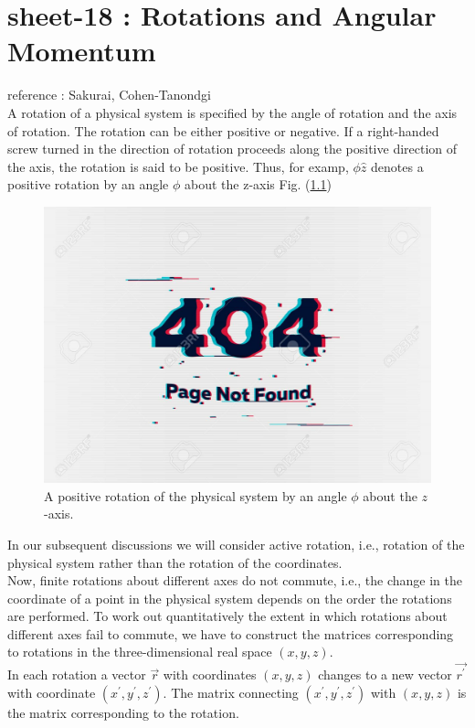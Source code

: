 
\chapter{sheet-18 : Rotations and Angular Momentum}

\ifpdf
\graphicspath{{Chapter23/figs/}}
\else
\graphicspath{{Chapter23/figs/}}
\fi

reference : Sakurai, Cohen-Tanondgi\\

A rotation of a physical system is specified by the angle of rotation and the axis of rotation. The rotation can be either positive or negative. If a right-handed screw turned in the direction of rotation proceeds along the positive direction of the axis, the rotation is said to be positive. Thus, for examp, $\phi\hat{z}$ denotes a positive rotation by an angle $\phi$ about the z-axis Fig. (\ref{chapter18.fig1})

\begin{figure}
	\centering
	\includegraphics[width=0.5\linewidth]{Pictures/not-found.jpg}
	\caption{A positive rotation of the physical system by an angle $\phi$ about the $z$-axis.}
	\label{chapter18.fig1}
\end{figure}
In our subsequent discussions we will consider active rotation, i.e., rotation of the physical system rather than the rotation of the coordinates.\\

Now, finite rotations about different axes do not commute, i.e., the change in the coordinate of a point in the physical system depends on the order the rotations are performed. To work out quantitatively the extent in which rotations about different axes fail to commute, we have to construct the matrices corresponding to rotations in the three-dimensional real space $(x,y,z)$.\\

In each rotation a vector $\vec{r}$ with coordinates $(x, y, z)$ changes to a new vector $\vec{r^\prime}$ with coordinate $(x^\prime,y^\prime,z^\prime)$. The matrix connecting $(x^\prime,y^\prime,z^\prime)$ with $(x,y,z)$ is the matrix corresponding to the rotation.

